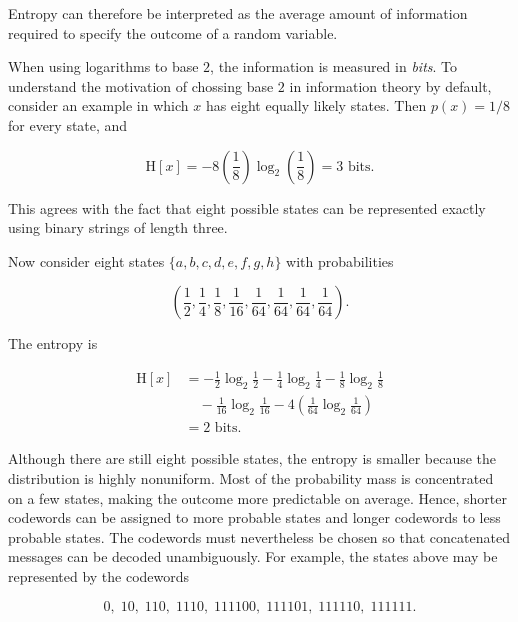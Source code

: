 \documentclass[10pt,twocolumn]{memoir}
\begin{document}
Entropy can therefore be interpreted as the average amount of information required to specify the outcome of a random variable.

When using logarithms to base $2$, the information is measured in \textit{bits}. To understand the motivation of chossing base $2$ in information theory by default, consider an example in which $x$ has eight equally likely states. Then $p(x)=1/8$ for every state, and

\begin{equation}
    \mathrm{H}[x] = -8\left(\frac{1}{8}\right)\log_2\left(\frac{1}{8}\right) = 3 \text{ bits}.
\end{equation}

This agrees with the fact that eight possible states can be represented exactly using binary strings of length three.

Now consider eight states $\{a,b,c,d,e,f,g,h\}$ with probabilities

\begin{equation}
    \left(
    \frac{1}{2},
    \frac{1}{4},
    \frac{1}{8},
    \frac{1}{16},
    \frac{1}{64},
    \frac{1}{64},
    \frac{1}{64},
    \frac{1}{64}
    \right).
\end{equation}

The entropy is

\begin{equation}
\begin{aligned}
    \mathrm{H}[x]
    &= -\frac{1}{2}\log_2\frac{1}{2}-\frac{1}{4}\log_2\frac{1}{4}-\frac{1}{8}\log_2\frac{1}{8} \\
    &\quad -\frac{1}{16}\log_2\frac{1}{16}-4\left(\frac{1}{64}\log_2\frac{1}{64}\right) \\
    &= 2 \text{ bits}.
\end{aligned}
\end{equation}

Although there are still eight possible states, the entropy is smaller because the distribution is highly nonuniform. Most of the probability mass is concentrated on a few states, making the outcome more predictable on average. Hence, shorter codewords can be assigned to more probable states and longer codewords to less probable states. The codewords must nevertheless be chosen so that concatenated messages can be decoded unambiguously. For example, the states above may be represented by the codewords

\begin{equation}
    0,\;10,\;110,\;1110,\;111100,\;111101,\;111110,\;111111.
\end{equation}
\end{document}
